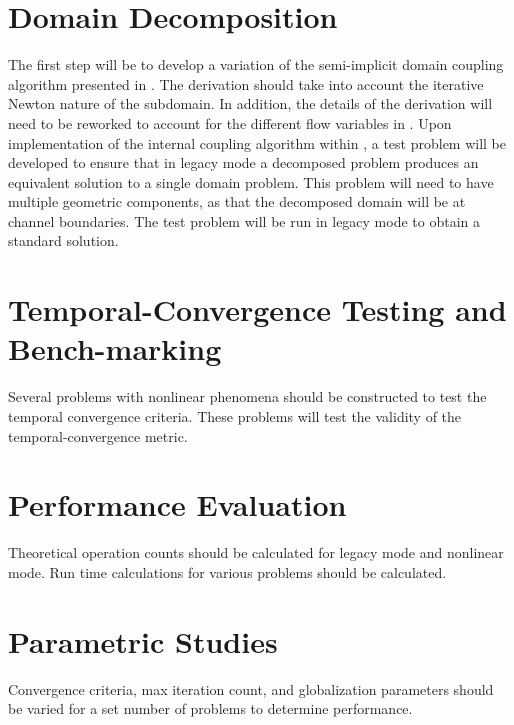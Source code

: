 \section{Domain Decomposition}
\label{sect:domain_coupling}
The first step will be to develop a variation of the semi-implicit domain coupling algorithm presented in .
The derivation should take into account the iterative Newton nature of the subdomain. 
In addition, the details of the derivation will need to be reworked to account for the different flow variables in \cobra.
Upon implementation of the internal coupling algorithm within \cobra, a test problem will be developed to ensure that in legacy mode a decomposed problem produces an equivalent solution to a single domain problem.
This problem will need to have multiple geometric components, as that the decomposed domain will be at channel boundaries.
The test problem will be run in legacy mode to obtain a standard solution.

\section{Temporal-Convergence Testing and Bench-marking}
\label{sect:proposal_temporal_testing}
Several problems with nonlinear phenomena should be constructed to test the temporal convergence criteria.
These problems will test the validity of the temporal-convergence metric.

\section{Performance Evaluation}
\label{sect:proposal_performance_evaluation}
Theoretical operation counts should be calculated for legacy mode and nonlinear mode.
Run time calculations for various problems should be calculated.

\section{Parametric Studies}
\label{sect:proposal_parametric_studies}
Convergence criteria, max iteration count, and globalization parameters should be varied for a set number of problems to determine performance.

